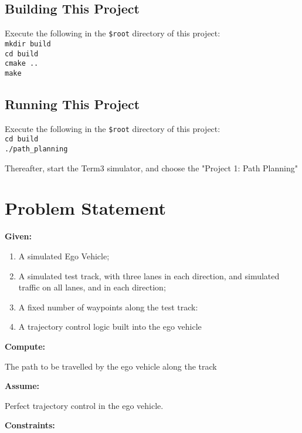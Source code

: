 \documentclass{article}
\begin{document}
\subsection{Building This Project}
Execute the following in the \texttt{\$root} directory of this project:
\texttt{\\ \noindent
    mkdir build \\
    cd build \\
    cmake .. \\
    make \\
    }


\subsection{Running This Project}
Execute the following in the \texttt{\$root} directory of this project:
\texttt{\\ \noindent
    cd build \\
    ./path\_planning
}

Thereafter, start the Term3 simulator, and choose the "Project 1: Path Planning"

\section{Problem Statement}
\textbf{Given:}

\begin{enumerate}
    \item A simulated Ego Vehicle;
    \item A simulated test track, with three lanes in each direction, and simulated traffic on all lanes, and in each direction;
    \item A fixed number of waypoints along the test track:
    \item A trajectory control logic built into the ego vehicle
\end{enumerate}

\noindent\textbf{Compute:}

\indent The path to be travelled by the ego vehicle along the track


\vspace*{1em}
\noindent\textbf{Assume:}

\indent Perfect trajectory control in the ego vehicle.

\vspace*{1em}
\noindent\textbf{Constraints:}
\end{document}

